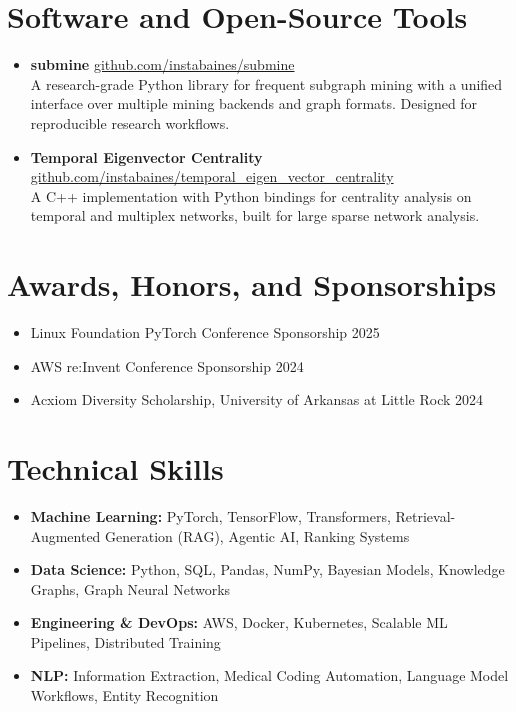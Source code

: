 \documentclass[11pt, letterpaper]{article}
\begin{document}
\section{Software and Open-Source Tools}

\begin{itemize}

  \item \textbf{submine} \hfill \href{https://github.com/instabaines/submine}{github.com/instabaines/submine}\\
  A research-grade Python library for frequent subgraph mining with a unified interface over multiple mining backends and graph formats. Designed for reproducible research workflows.

  \item \textbf{Temporal Eigenvector Centrality} \hfill \href{https://github.com/instabaines/temporal_eigen_vector_centrality}{github.com/instabaines/temporal\_eigen\_vector\_centrality}\\
  A C++ implementation with Python bindings for centrality analysis on temporal and multiplex networks, built for large sparse network analysis.

\end{itemize}

\section{Awards, Honors, and Sponsorships}

\begin{itemize}
  \item Linux Foundation PyTorch Conference Sponsorship \hfill 2025
  \item AWS re:Invent Conference Sponsorship \hfill 2024
  \item Acxiom Diversity Scholarship, University of Arkansas at Little Rock \hfill 2024
\end{itemize}

\section{Technical Skills}

\begin{itemize}[leftmargin=1.2em, itemsep=3pt]
  \item \textbf{Machine Learning:} PyTorch, TensorFlow, Transformers, Retrieval-Augmented Generation (RAG), Agentic AI, Ranking Systems
  \item \textbf{Data Science:} Python, SQL, Pandas, NumPy, Bayesian Models, Knowledge Graphs, Graph Neural Networks
  \item \textbf{Engineering \& DevOps:} AWS, Docker, Kubernetes, Scalable ML Pipelines, Distributed Training
  \item \textbf{NLP:} Information Extraction, Medical Coding Automation, Language Model Workflows, Entity Recognition
\end{itemize}
\end{document}
